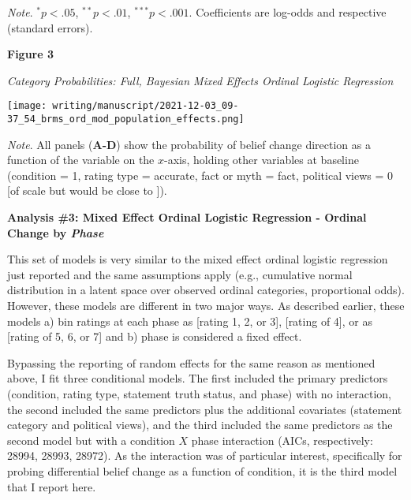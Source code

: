 \documentclass[12pt]{article}  %
\begin{document}
\singlespacing
\textit{Note}. $^{*}p < .05$, $^{**}p < .01$, $^{***}p < .001$. Coefficients are log-odds and respective (standard errors).

\newpage


\doublespacing


\newpage

\textbf{Figure 3}

\textit{Category Probabilities: Full, Bayesian Mixed Effects Ordinal Logistic Regression}

\vspace{0.5cm}

\hspace{-1.5cm}\texttt{[image: writing/manuscript/2021-12-03\_09-37\_54\_brms\_ord\_mod\_population\_effects.png]}

\singlespacing
\noindent\textit{Note}. All panels (\textbf{A-D}) show the probability of belief change direction as a function of the variable on the $x$-axis, holding other variables at baseline (condition = 1, rating type = accurate, fact or myth = fact, political views = 0 [of scale but would be close to ]).

\newpage


\doublespacing

\noindent\textbf{Analysis \#3: Mixed Effect Ordinal Logistic Regression - Ordinal Change by \textit{Phase}}

This set of models is very similar to the mixed effect ordinal logistic regression just reported and the same assumptions apply (e.g., cumulative normal distribution in a latent space over observed ordinal categories, proportional odds). However, these models are different in two major ways. As described earlier, these models a) bin ratings at each phase as  [rating 1, 2, or 3],  [rating of 4], or as  [rating of 5, 6, or 7] and b) phase is considered a fixed effect.

Bypassing the reporting of random effects for the same reason as mentioned above, I fit three conditional models. The first included the primary predictors (condition, rating type, statement truth status, and phase) with no interaction, the second included the same predictors plus the additional covariates (statement category and political views), and the third included the same predictors as the second model but with a condition $X$ phase interaction (AICs, respectively: 28994, 28993, 28972). As the interaction was of particular interest, specifically for probing differential belief change as a function of condition, it is the third model that I report here.
\end{document}
